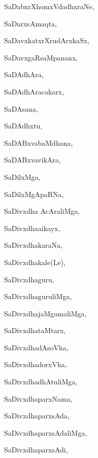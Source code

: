 \begin{multicols}{3}
{\noindent
{SaDabxrXhomxVdadhxraNe}, \pageref{SaDabxrXhomxVdadhxraNe}

\noindent
{SaDarxsAmaqta}, \pageref{SaDarxsAmaqta}

\noindent
{SaDavxkatxrXrudArxkaSx}, \pageref{SaDavxkatxrXrudArxkaSx}

\noindent
{SaDavxgaRsaMpananx}, \pageref{SaDavxgaRsaMpananx}

\noindent
{SaDAdhAra}, \pageref{SaDAdhAra}

\noindent
{SaDAdhAracakarx}, \pageref{SaDAdhAracakarx}

\noindent
{SaDAsana}, \pageref{SaDAsana}

\noindent
{SaDAdhxtu}, \pageref{SaDAdhxtu}

\noindent
{SaDABxvabaMdhana}, \pageref{SaDABxvabaMdhana}

\noindent
{SaDABxvavikAra}, \pageref{SaDABxvavikAra}

\noindent
{SaDilxMga}, \pageref{SaDilxMga}

\noindent
{SaDilxMgApaRNa}, \pageref{SaDilxMgApaRNa}

\noindent
{SaDivxdha AcAraliMga}, \pageref{SaDivxdhaAcAraliMga}

\noindent
{SaDivxdha{ai}kayx}, 

\noindent
{SaDivxdhakaraNa}, \pageref{SaDivxdhakaraNa}

\noindent
{SaDivxdhakale(Le)}, \pageref{SaDivxdhakaleLe}

\noindent
{SaDivxdhaguru}, \pageref{SaDivxdhaguru}

\noindent
{SaDivxdhaguruliMga}, \pageref{SaDivxdhaguruliMga}

\noindent
{SaDivxdhajaMgamaliMga}, \pageref{SaDivxdhajaMgamaliMga}

\noindent
{SaDivxdhataMtarx}, \pageref{SaDivxdhataMtarx}

\noindent
{SaDivxdhadAsoVha}, \pageref{SaDivxdhadAsoVha}

\noindent
{SaDivxdhadorxVha}, \pageref{SaDivxdhadorxVha}

\noindent
{SaDivxdhadhAtuliMga}, \pageref{SaDivxdhadhAtuliMga}

\noindent
{SaDivxdhaparxNama}, \pageref{SaDivxdhaparxNama}

\noindent
{SaDivxdhaparxsAda}, \pageref{SaDivxdhaparxsAda}

\noindent
{SaDivxdhaparxsAdaliMga}, \pageref{SaDivxdhaparxsAdaliMga}

\noindent
{SaDivxdhaparxsAdi}, \pageref{SaDivxdhaparxsAdi}

}
\end{multicols}
